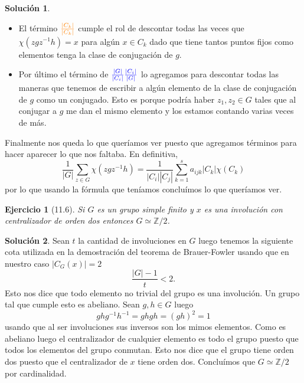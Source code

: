 \documentclass[11pt]{article}
\theoremstyle{plain}
\newtheorem*{ej}{Ejercicio}
\theoremstyle{definition}
\newtheorem*{sol}{Solución}
\theoremstyle{remark}
\newcommand\ZZ{\mathbb{Z}}
\begin{document}
\begin{sol}
\begin{itemize}
	\item El término $\textcolor{orange}{\frac{|C_k|}{|C_k|}}$ cumple el rol de descontar todas las veces que $\chi(zgz^{-1}h) = x$ para algún $x \in C_k$ dado que tiene tantos puntos fijos como elementos tenga la clase de conjugación de $g$.
	
	\item Por último el término de $\textcolor{blue}{\frac{|G|}{|C_i|} \frac{|C_i|}{|G|}}$  lo agregamos para descontar todas las maneras que tenemos de escribir a algún elemento de la clase de conjugación de $g$ como un conjugado. Esto es porque podría haber $z_1,z_2 \in G$ tales que al conjugar a $g$ me dan el mismo elemento y los estamos contando varias veces de más.
    \end{itemize}
	Finalmente nos queda lo que queríamos ver puesto que agregamos términos para hacer aparecer lo que nos faltaba. En definitiva,
	\[
	\dfrac{1}{|G|} \sum_{z \in G} \chi(zgz^{-1}h) = \dfrac{1}{|C_i||C_j|} \sum_{k=1}^s a_{ijk} |C_k| \chi(C_k)
	\]
	por lo que usando la fórmula que teníamos concluímos lo que queríamos ver.
\end{sol}

\bigskip

\begin{tcolorbox}[colback=teal!25!white,colframe=teal!75!black]
	\begin{ej}[11.6]
		Si $G$ es un grupo simple finito y $x$ es una involución con centralizador de orden dos entonces $G \simeq \ZZ /2$.
	\end{ej}	
\end{tcolorbox}
\medskip

\begin{sol}
 Sean $t$ la cantidad de involuciones en $G$ luego tenemos la siguiente cota utilizada en la demostración del teorema de Brauer-Fowler usando que en nuestro caso $|C_G(x)|=2$
 \[
 \dfrac{|G|-1}{t} < 2.
 \]
 Esto nos dice que todo elemento no trivial del grupo es una involución. Un grupo tal que cumple esto es abeliano. Sean $g,h \in G$ luego
 \[
 ghg^{-1}h^{-1} = ghgh = (gh)^2 = 1
 \]
 usando que al ser involuciones sus inversos son los mimos elementos. Como es abeliano luego el centralizador de cualquier elemento es todo el grupo puesto que todos los elementos del grupo conmutan. Esto nos dice que el grupo tiene orden dos puesto que el centralizador de $x$ tiene orden dos. Concluímos que $G \simeq \ZZ/2$ por cardinalidad.
\end{sol}
\end{document}
